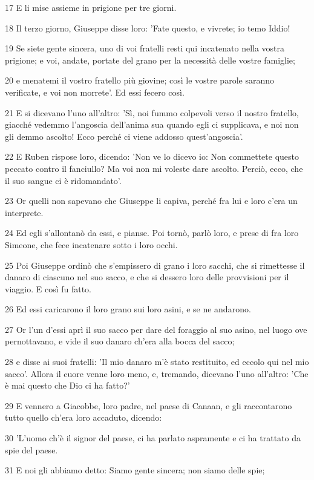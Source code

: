 \par 17 E li mise assieme in prigione per tre giorni.
\par 18 Il terzo giorno, Giuseppe disse loro: 'Fate questo, e vivrete; io temo Iddio!
\par 19 Se siete gente sincera, uno di voi fratelli resti qui incatenato nella vostra prigione; e voi, andate, portate del grano per la necessità delle vostre famiglie;
\par 20 e menatemi il vostro fratello più giovine; così le vostre parole saranno verificate, e voi non morrete'. Ed essi fecero così.
\par 21 E si dicevano l'uno all'altro: 'Sì, noi fummo colpevoli verso il nostro fratello, giacché vedemmo l'angoscia dell'anima sua quando egli ci supplicava, e noi non gli demmo ascolto! Ecco perché ci viene addosso quest'angoscia'.
\par 22 E Ruben rispose loro, dicendo: 'Non ve lo dicevo io: Non commettete questo peccato contro il fanciullo? Ma voi non mi voleste dare ascolto. Perciò, ecco, che il suo sangue ci è ridomandato'.
\par 23 Or quelli non sapevano che Giuseppe li capiva, perché fra lui e loro c'era un interprete.
\par 24 Ed egli s'allontanò da essi, e pianse. Poi tornò, parlò loro, e prese di fra loro Simeone, che fece incatenare sotto i loro occhi.
\par 25 Poi Giuseppe ordinò che s'empissero di grano i loro sacchi, che si rimettesse il danaro di ciascuno nel suo sacco, e che si dessero loro delle provvisioni per il viaggio. E così fu fatto.
\par 26 Ed essi caricarono il loro grano sui loro asini, e se ne andarono.
\par 27 Or l'un d'essi aprì il suo sacco per dare del foraggio al suo asino, nel luogo ove pernottavano, e vide il suo danaro ch'era alla bocca del sacco;
\par 28 e disse ai suoi fratelli: 'Il mio danaro m'è stato restituito, ed eccolo qui nel mio sacco'. Allora il cuore venne loro meno, e, tremando, dicevano l'uno all'altro: 'Che è mai questo che Dio ci ha fatto?'
\par 29 E vennero a Giacobbe, loro padre, nel paese di Canaan, e gli raccontarono tutto quello ch'era loro accaduto, dicendo:
\par 30 'L'uomo ch'è il signor del paese, ci ha parlato aspramente e ci ha trattato da spie del paese.
\par 31 E noi gli abbiamo detto: Siamo gente sincera; non siamo delle spie;
